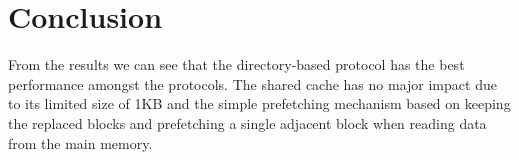 \documentclass[12pt, a4paper, twoside]{article}
\begin{document}
\section{Conclusion}

From the results we can see that the directory-based protocol has the best performance amongst the protocols.
The shared cache has no major impact due to its limited size of 1KB and the simple prefetching mechanism
based on keeping the replaced blocks and prefetching a single adjacent block when reading data from the main memory.
\end{document}
